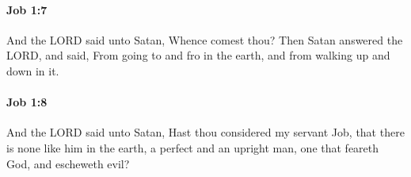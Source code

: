 		\paragraph{Job 1:7} %
			\label{JOB-1-7}

			And the LORD said unto Satan, Whence comest thou? Then Satan answered the LORD, and said, From going to and fro in the earth, and from walking up and down in it.


		\paragraph{Job 1:8} %
			\label{JOB-1-8}

			And the LORD said unto Satan, Hast thou considered my servant Job, that there is none like him in the earth, a perfect and an upright man, one that feareth God, and escheweth evil?


